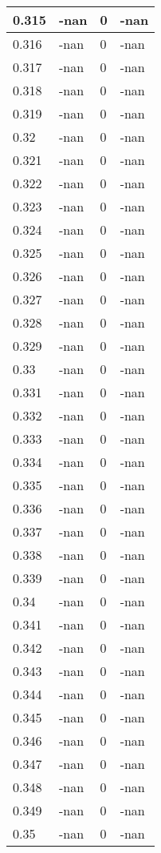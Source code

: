\documentclass[a4paper,14pt]{extarticle}
\begin{document}
\begin{longtable}{||m{3cm}||m{3cm}|m{3cm}||m{3cm}||}
\hline
0.315 & -nan & 0 & -nan\\
\hline
0.316 & -nan & 0 & -nan\\
\hline
0.317 & -nan & 0 & -nan\\
\hline
0.318 & -nan & 0 & -nan\\
\hline
0.319 & -nan & 0 & -nan\\
\hline
0.32 & -nan & 0 & -nan\\
\hline
0.321 & -nan & 0 & -nan\\
\hline
0.322 & -nan & 0 & -nan\\
\hline
0.323 & -nan & 0 & -nan\\
\hline
0.324 & -nan & 0 & -nan\\
\hline
0.325 & -nan & 0 & -nan\\
\hline
0.326 & -nan & 0 & -nan\\
\hline
0.327 & -nan & 0 & -nan\\
\hline
0.328 & -nan & 0 & -nan\\
\hline
0.329 & -nan & 0 & -nan\\
\hline
0.33 & -nan & 0 & -nan\\
\hline
0.331 & -nan & 0 & -nan\\
\hline
0.332 & -nan & 0 & -nan\\
\hline
0.333 & -nan & 0 & -nan\\
\hline
0.334 & -nan & 0 & -nan\\
\hline
0.335 & -nan & 0 & -nan\\
\hline
0.336 & -nan & 0 & -nan\\
\hline
0.337 & -nan & 0 & -nan\\
\hline
0.338 & -nan & 0 & -nan\\
\hline
0.339 & -nan & 0 & -nan\\
\hline
0.34 & -nan & 0 & -nan\\
\hline
0.341 & -nan & 0 & -nan\\
\hline
0.342 & -nan & 0 & -nan\\
\hline
0.343 & -nan & 0 & -nan\\
\hline
0.344 & -nan & 0 & -nan\\
\hline
0.345 & -nan & 0 & -nan\\
\hline
0.346 & -nan & 0 & -nan\\
\hline
0.347 & -nan & 0 & -nan\\
\hline
0.348 & -nan & 0 & -nan\\
\hline
0.349 & -nan & 0 & -nan\\
\hline
0.35 & -nan & 0 & -nan\\

\end{longtable}
\end{document}

